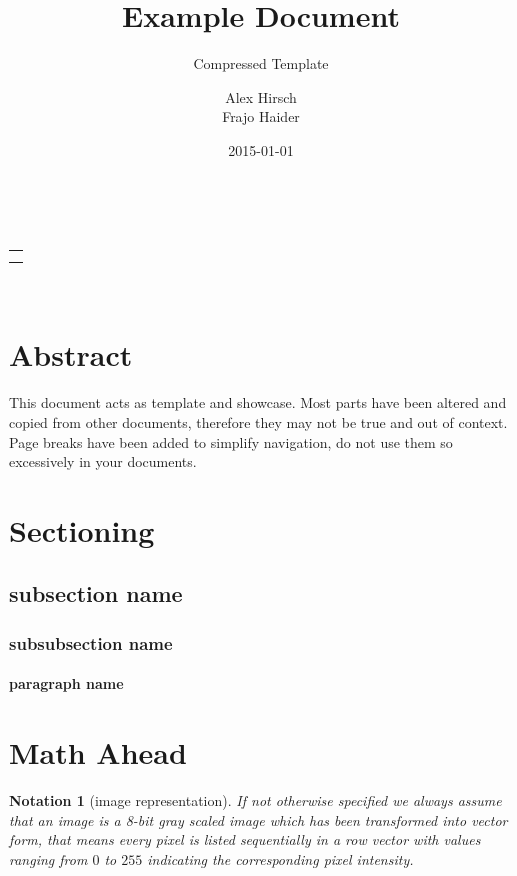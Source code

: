 \documentclass[10pt,a4paper,parskip=half]{scrartcl}
\title{Example Document}
\subtitle{Compressed Template}
\author{Alex Hirsch \\ Frajo Haider}
\date{2015-01-01}
\makeatletter
\theoremstyle{plain}
\newtheorem{notation}[theorem]{Notation}
\def\maketitle{%
    \begin{minipage}[t]{0.8\linewidth}%
        \flushleft%
        \LARGE \@title\\
        \large \@subtitle
    \end{minipage}%
    \hfill%
    \begin{minipage}[t]{0.2\linewidth}%
        \flushright%
        \begin{tabular}[t]{r}\@author\\\@date\end{tabular}\\
    \end{minipage}%
}
\makeatother
\begin{document}
\maketitle

\section*{Abstract}
\label{sec:abstract}

This document acts as template and showcase. Most parts have been altered and
copied from other documents, therefore they may not be true and out of context.
Page breaks have been added to simplify navigation, do not use them so
excessively in your documents.

\tableofcontents

\newpage

\section{Sectioning}
\label{sec:sectioning}

\lipsum[3]

\subsection{subsection name}
\label{sub:subsection_name}

\lipsum[2]

\lipsum[3]

\subsubsection{subsubsection name}
\label{ssub:subsubsection_name}

\lipsum[3]

\paragraph{paragraph name}
\label{par:paragraph_name}

\lipsum[3]

\newpage

\section{Math Ahead}
\label{sec:math_ahead}

\begin{notation}[image representation]
    If not otherwise specified we always assume that an image is a 8-bit gray
    scaled image which has been transformed into vector form, that means every
    pixel is listed sequentially in a row vector with values ranging from $0$
    to $255$ indicating the corresponding pixel intensity.
\end{notation}
\end{document}
